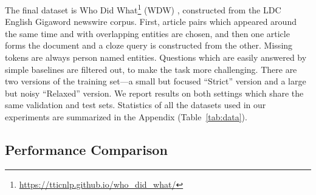 \documentclass[11pt,a4paper]{article}
\begin{document}
The final dataset is Who Did What\footnote{\scriptsize \url{ https://tticnlp.github.io/who_did_what/}} (WDW) \citep{onishi2016did},
constructed from the LDC English Gigaword newswire corpus.
First, article pairs which appeared around the same time and with overlapping entities are chosen, and then one article forms the document and a cloze query is constructed from the other. Missing tokens are always person named entities.
Questions which are easily answered by simple baselines are filtered out,
to make the task more challenging. There are two versions of the training set---a small but focused ``Strict'' version and a large but noisy ``Relaxed'' version.
We report results on both settings which share the same validation and test sets. Statistics of all the datasets used in our experiments are summarized in the Appendix (Table~\ref{tab:data}).

\subsection{Performance Comparison}
\end{document}

